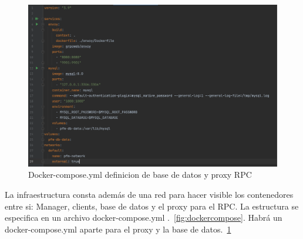 \begin{figure}[H]
    \centering
    \includegraphics[scale = 0.3]{part/Proyecto_ejecutivo/memoria_constructiva/docker/docker-compose-gen}
    \caption{Docker-compose.yml definicion de base de datos y proxy RPC}\label{fig:dockercomposegen}
\end{figure}

La infraestructura consta además de una red para hacer visible los contenedores entre si: Manager, clients, base de datos y el proxy para el RPC. La estructura se especifica en un archivo docker-compose.yml .~\cref{fig:dockercompose}. Habrá un docker-compose.yml aparte para el proxy y la base de datos.~\cref{fig:dockercomposegen}

